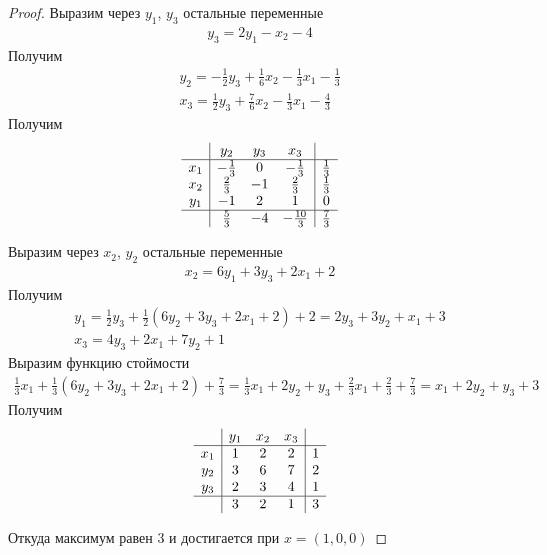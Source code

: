 \begin{proof}
	Выразим через $y_{1}$, $y_{3}$ остальные переменные
	\begin{gather*}
		y_{3} = 2y_{1} - x_{2} - 4
	\end{gather*}
	Получим
	\begin{gather*}
		y_{2}
		= -\frac{1}{2} y_{3} + \frac{1}{6} x_{2} - \frac{1}{3} x_{1} - \frac{1}{3}\\
		x_{3}
		= \frac{1}{2} y_{3} + \frac{7}{6} x_{2} - \frac{1}{3} x_{1} - \frac{4}{3}
	\end{gather*}
	Получим
	\begin{gather*}
	\begin{array}{c|ccc|c} 
		& y_{2} & y_{3} & x_{3} & \\
		\hline 
		x_{1} & -\frac{1}{3} & 0 & -\frac{1}{3} & \frac{1}{3}\\
		x_{2} & \frac{2}{3} & -1 & \frac{2}{3} & \frac{1}{3}\\
		y_{1} & -1 & 2 & 1 & 0\\
		\hline 
		& \frac{5}{3} & -4 & -\frac{10}{3} & \frac{7}{3}
	\end{array}
	\end{gather*}

	Выразим через $x_{2}$, $y_{2}$ остальные переменные
	\begin{gather*}
		x_{2} = 6 y_{1} + 3 y_{3} + 2 x_{1} + 2
	\end{gather*}
	Получим
	\begin{gather*}
		y_{1}
		= \frac{1}{2} y_{3} + \frac{1}{2} (6 y_{2} + 3 y_{3} + 2 x_{1} + 2) + 2
		= 2 y_{3} + 3 y_{2} + x_{1} + 3\\
		x_{3}
		= 4 y_{3} + 2 x_{1} + 7 y_{2} + 1
	\end{gather*}
	Выразим функцию стоймости
	\begin{gather*}
		\frac{1}{3} x_{1} + \frac{1}{3} (6 y_{2} + 3 y_{3} + 2 x_{1} + 2) + \frac{7}{3}
		= \frac{1}{3} x_{1} + 2 y_{2} + y_{3} + \frac{2}{3} x_{1} + \frac{2}{3} + \frac{7}{3}
		= x_{1} + 2 y_{2} + y_{3} + 3
	\end{gather*}
	Получим
	\begin{gather*}
	\begin{array}{c|ccc|c} 
		& y_{1} & x_{2} & x_{3} & \\
		\hline 
		x_{1} & 1 & 2 & 2 & 1 \\
		y_{2} & 3 & 6 & 7 & 2\\
		y_{3} & 2 & 3 & 4 & 1\\
		\hline 
		& 3 & 2 & 1 & 3
	\end{array}
	\end{gather*}

	Откуда максимум равен $3$ и достигается при $x = (1, 0, 0)$	
\end{proof}
\vskip 0.6in



